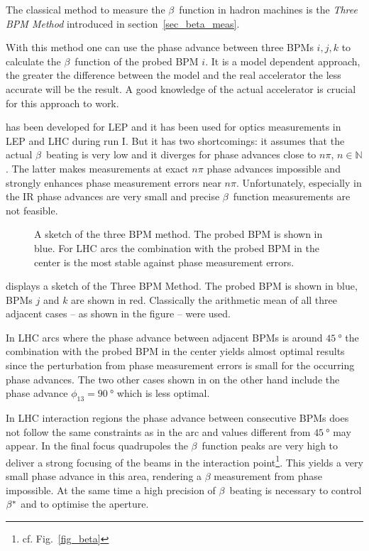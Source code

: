 The classical method to measure the $\beta$~function in hadron machines is the \emph{Three BPM Method}
introduced in section~\ref{sec_beta_meas}.



With this method one can use the phase advance between three BPMs $i,j,k$ to calculate the $\beta$~function
of the probed BPM $i$. It is a model dependent approach, the greater the difference between the model
and the real accelerator the less accurate will be the result. A good knowledge of the actual accelerator
is crucial for this approach to work.

 has been developed for LEP and it has been used for optics measurements in LEP
and LHC during run I.
But it has two shortcomings: it assumes that the actual $\beta$~beating is very low and it
diverges for phase advances close to $n\pi$, $n \in \mathbb{N}$. The latter makes measurements at
exact $n\pi$ phase advances impossible and strongly enhances phase measurement errors near $n\pi$.
Unfortunately, especially in the IR phase advances are very small and precise $\beta$~function measurements
are not feasible.

\begin{figure}
    \centering
     
    \caption{A sketch of the three BPM method. The probed BPM is shown in blue. For LHC arcs the
    combination with the probed BPM in the center is the most stable against phase measurement errors.}
    \label{fig_threebpm}
\end{figure}
%
 displays a sketch of the Three BPM Method. The probed BPM is shown in blue,
BPMs $j$ and $k$ are shown in red.
Classically the arithmetic mean of all three adjacent cases -- as shown in the figure -- were used.


In LHC arcs where the phase advance between adjacent BPMs is around
$\SI{45}{\degree}$ the combination with the probed BPM in the center yields almost optimal results
since the perturbation from phase measurement errors is small for the occurring phase advances.
The two other cases shown in  on the other hand include the 
phase advance $\phi_{13} = \SI{90}{\degree}$ which is less optimal.

In LHC interaction regions the phase advance between consecutive BPMs does not follow the same constraints
as in the arc and values different from $\SI{45}{\degree}$ may appear. In the final focus quadrupoles
the $\beta$~function peaks are very high to deliver a strong focusing of the beams in the interaction
point\footnote{cf. Fig.~\ref{fig_beta}}. This yields a very small phase advance in this area, rendering a $\beta$ measurement from phase
impossible. At the same time a high precision of $\beta$~beating is necessary to control $\beta^*$ and
to optimise the aperture.

